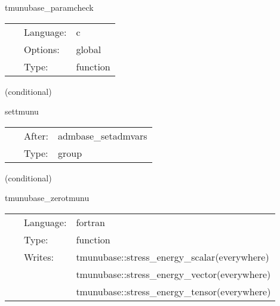 \documentclass{article}
\begin{document}
\vspace{5mm}


\hspace{5mm} tmunubase\_paramcheck 

\hspace{5mm}{\it check that no deprecated parameters are used. } 


\hspace{5mm}

 \begin{tabular*}{160mm}{cll} 
~ & Language:  & c \\ 
~ & Options:  & global \\ 
~ & Type:  & function \\ 
\end{tabular*} 


\vspace{5mm}

   (conditional) 

\hspace{5mm} settmunu 

\hspace{5mm}{\it group for calculating the stress-energy tensor } 


\hspace{5mm}

 \begin{tabular*}{160mm}{cll} 
~ & After:  & admbase\_setadmvars \\ 
~ & Type:  & group \\ 
\end{tabular*} 


\vspace{5mm}

   (conditional) 

\hspace{5mm} tmunubase\_zerotmunu 

\hspace{5mm}{\it initialise the stress-energy tensor to zero } 


\hspace{5mm}

 \begin{tabular*}{160mm}{cll} 
~ & Language:  & fortran \\ 
~ & Type:  & function \\ 
~ & Writes:  & tmunubase::stress\_energy\_scalar(everywhere) \\ 
~& ~ &tmunubase::stress\_energy\_vector(everywhere)\\ 
~& ~ &tmunubase::stress\_energy\_tensor(everywhere)\\ 
\end{tabular*} 
\end{document}

